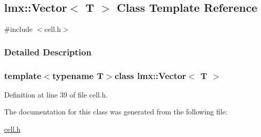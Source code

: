 \hypertarget{classlmx_1_1_vector}{}\subsection{lmx\+:\+:Vector$<$ T $>$ Class Template Reference}
\label{classlmx_1_1_vector}


{\ttfamily \#include $<$cell.\+h$>$}



\subsubsection{Detailed Description}
\subsubsection*{template$<$typename T$>$class lmx\+::\+Vector$<$ T $>$}



Definition at line 39 of file cell.\+h.



The documentation for this class was generated from the following file\+:\begin{DoxyCompactItemize}
\item 
\hyperlink{cell_8h}{cell.\+h}\end{DoxyCompactItemize}
